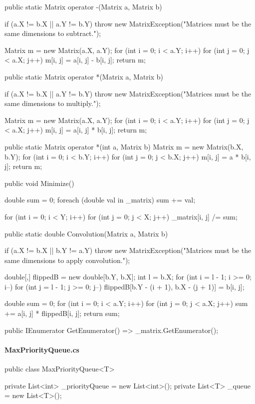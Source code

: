 \begin{flushleft}
\begin{cscode}
{    public static Matrix operator -(Matrix a, Matrix b)
    {
        if (a.X != b.X || a.Y != b.Y) throw new MatrixException("Matrices must be the same dimensions to subtract.");

        Matrix m = new Matrix(a.X, a.Y);
        for (int i = 0; i < a.Y; i++) for (int j = 0; j < a.X; j++) m[i, j] = a[i, j] - b[i, j];
        return m;
    }
    public static Matrix operator *(Matrix a, Matrix b)
    {
        if (a.X != b.X || a.Y != b.Y) throw new MatrixException("Matrices must be the same dimensions to multiply.");

        Matrix m = new Matrix(a.X, a.Y);
        for (int i = 0; i < a.Y; i++) for (int j = 0; j < a.X; j++) m[i, j] = a[i, j] * b[i, j];
        return m;
    }

    public static Matrix operator *(int a, Matrix b)
    {
        Matrix m = new Matrix(b.X, b.Y);
        for (int i = 0; i < b.Y; i++) for (int j = 0; j < b.X; j++) m[i, j] = a * b[i, j];
        return m;
    }

    public void Minimize()
    {
        double sum = 0;
        foreach (double val in _matrix) sum += val;

        for (int i = 0; i < Y; i++)
        {
            for (int j = 0; j < X; j++)
            {
                _matrix[i, j] /= sum;
            }
        }
    }

    public static double Convolution(Matrix a, Matrix b)
    {
        if (a.X != b.X || b.Y != a.Y) throw new MatrixException("Matrices must be the same dimensions to apply convolution.");

        double[,] flippedB = new double[b.Y, b.X];
        int l = b.X;
        for (int i = l - 1; i >= 0; i--) for (int j = l - 1; j >= 0; j--) flippedB[b.Y - (i + 1), b.X - (j + 1)] = b[i, j];

        double sum = 0;
        for (int i = 0; i < a.Y; i++) for (int j = 0; j < a.X; j++) sum += a[i, j] * flippedB[i, j];
        return sum;
    }

    public IEnumerator GetEnumerator() => _matrix.GetEnumerator();

}
    \end{cscode}
\pagebreak
    
    \paragraph{MaxPriorityQueue.cs}
    \begin{cscode}
public class MaxPriorityQueue<T>
{
    private List<int> _priorityQueue = new List<int>();
    private List<T> _queue = new List<T>();

}
\end{cscode}
\end{flushleft}
